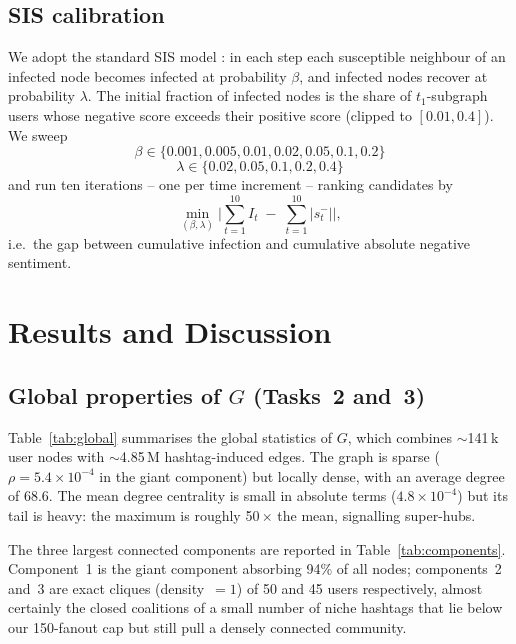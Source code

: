 \documentclass[conference]{IEEEtran}
\begin{document}
\subsection{SIS calibration}
\label{sec:sis}
We adopt the standard SIS model
\cite{kermack1927contribution,pastor2001epidemic}: in each step
each susceptible neighbour of an infected node becomes infected
at probability $\beta$, and infected nodes recover at
probability $\lambda$.  The initial fraction of infected nodes
is the share of $t_{1}$-subgraph users whose negative score
exceeds their positive score (clipped to $[0.01, 0.4]$).  We
sweep
\begin{equation*}
  \beta \in \{0.001, 0.005, 0.01, 0.02, 0.05, 0.1, 0.2\}
\end{equation*}
\begin{equation*}
  \lambda \in \{0.02, 0.05, 0.1, 0.2, 0.4\}
\end{equation*}
and run ten iterations -- one per time increment -- ranking
candidates by
\begin{equation}
  \min_{(\beta, \lambda)}\!
  \Big| \sum_{t=1}^{10} I_t \;-\; \sum_{t=1}^{10} |s^{-}_{t}| \Big|,
  \label{eq:sis-fit}
\end{equation}
i.e.\ the gap between cumulative infection and cumulative
absolute negative sentiment.

\section{Results and Discussion}
\label{sec:results}

\subsection{Global properties of $G$ (Tasks~2 and~3)}
Table~\ref{tab:global} summarises the global statistics of
$G$, which combines $\sim$141\,k user nodes with $\sim$4.85\,M
hashtag-induced edges.  The graph is sparse
($\rho = 5.4 \times 10^{-4}$ in the giant component) but
locally dense, with an average degree of 68.6.
The mean degree centrality is small in absolute terms
($4.8\!\times\!10^{-4}$) but its tail is heavy: the maximum is
roughly 50\,$\times$ the mean, signalling super-hubs.



The three largest connected components are reported in
Table~\ref{tab:components}.  Component~1 is the giant component
absorbing 94\% of all nodes; components~2 and~3 are exact
cliques (density~$=1$) of 50 and 45 users respectively, almost
certainly the closed coalitions of a small number of niche
hashtags that lie below our 150-fanout cap but still pull a
densely connected community.
\end{document}
